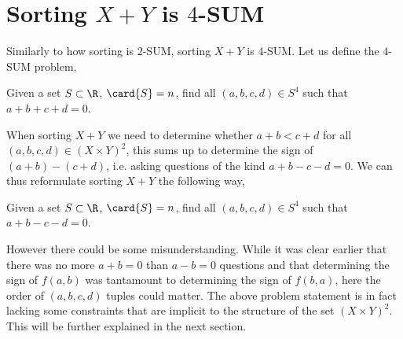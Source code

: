 \section{Sorting $X+Y$ is $4$-SUM}

Similarly to how sorting is $2$-SUM, sorting $X+Y$ is $4$-SUM. Let us define
the $4$-SUM problem,

\begin{problem}
Given a set $S \subset \R$, $\card{S} = n$, find all $(a,b,c,d) \in S^4$ such that
$a + b + c + d = 0$.
\end{problem}

When sorting $X+Y$ we need to determine whether $a + b < c + d$ for all
$(a,b,c,d) \in (X \times Y)^2$, this sums up to determine the sign of $(a+b) -
(c+d)$, i.e. asking questions of the kind $a + b - c - d = 0$. We can thus
reformulate sorting $X+Y$ the following way,

\begin{problem}
Given a set $S \subset \R$, $\card{S} = n$, find all $(a,b,c,d) \in S^4$ such
that $a + b - c - d = 0$.
\end{problem}

However there could be some misunderstanding. While it was clear earlier that
there was no more $a+b=0$ than $a-b=0$ questions and that determining the sign
of $f(a,b)$ was tantamount to determining the sign of $f(b,a)$, here the order
of $(a,b,c,d)$ tuples could matter. The above problem statement is in fact
lacking some constraints that are implicit to the structure of the set $(X
\times Y)^2$. This will be further explained in the next section.
